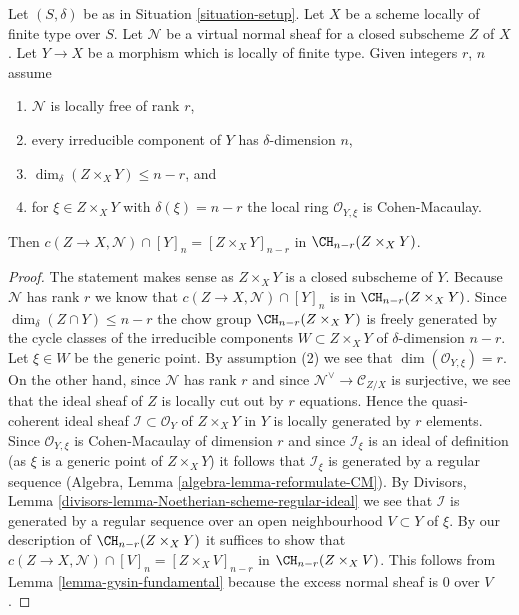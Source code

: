 \begin{lemma}
\label{lemma-gysin-easy}
Let $(S, \delta)$ be as in Situation \ref{situation-setup}. Let $X$ be a scheme
locally of finite type over $S$. Let $\mathcal{N}$ be a virtual normal
sheaf for a closed subscheme $Z$ of $X$. Let $Y \to X$ be a morphism
which is locally of finite type. Given integers $r$, $n$ assume
\begin{enumerate}
\item $\mathcal{N}$ is locally free of rank $r$,
\item every irreducible component of $Y$ has $\delta$-dimension $n$,
\item $\dim_\delta(Z \times_X Y) \leq n - r$, and
\item for $\xi \in Z \times_X Y$ with $\delta(\xi) = n - r$
the local ring $\mathcal{O}_{Y, \xi}$ is Cohen-Macaulay.
\end{enumerate}
Then $c(Z \to X, \mathcal{N}) \cap [Y]_n = [Z \times_X Y]_{n - r}$
in $\CH_{n - r}(Z \times_X Y)$.
\end{lemma}

\begin{proof}
The statement makes sense as $Z \times_X Y$ is a closed subscheme of $Y$.
Because $\mathcal{N}$ has rank $r$ we know that
$c(Z \to X, \mathcal{N}) \cap [Y]_n$ is in $\CH_{n - r}(Z \times_X Y)$.
Since $\dim_\delta(Z \cap Y) \leq n - r$ the chow group
$\CH_{n - r}(Z \times_X Y)$ is freely generated by the
cycle classes of the irreducible components $W \subset Z \times_X Y$
of $\delta$-dimension $n - r$. Let $\xi \in W$ be the generic point.
By assumption (2) we see that $\dim(\mathcal{O}_{Y, \xi}) = r$.
On the other hand, since $\mathcal{N}$ has rank $r$ and since
$\mathcal{N}^\vee \to \mathcal{C}_{Z/X}$ is surjective, we see that
the ideal sheaf of $Z$ is locally cut out by $r$ equations.
Hence the quasi-coherent ideal sheaf $\mathcal{I} \subset \mathcal{O}_Y$
of $Z \times_X Y$ in $Y$ is locally generated by $r$ elements.
Since $\mathcal{O}_{Y, \xi}$ is Cohen-Macaulay of dimension $r$
and since $\mathcal{I}_\xi$ is an ideal of definition (as $\xi$ is
a generic point of $Z \times_X Y$) it follows that $\mathcal{I}_\xi$
is generated by a regular sequence
(Algebra, Lemma \ref{algebra-lemma-reformulate-CM}).
By Divisors, Lemma \ref{divisors-lemma-Noetherian-scheme-regular-ideal}
we see that $\mathcal{I}$ is generated by a regular sequence over
an open neighbourhood $V \subset Y$ of $\xi$. By our description of
$\CH_{n - r}(Z \times_X Y)$ it suffices to show that
$c(Z \to X, \mathcal{N}) \cap [V]_n = [Z \times_X V]_{n - r}$
in $\CH_{n - r}(Z \times_X V)$. This follows from
Lemma \ref{lemma-gysin-fundamental}
because the excess normal sheaf is $0$ over $V$.
\end{proof}

